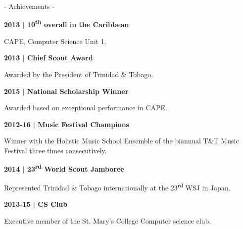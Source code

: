 \documentclass{article}
\newcommand{\ts}{\textsuperscript}
\begin{document}
\begin{minipage}[t]{0.35\textwidth}
{\LARGE\sc - Achievements -} \smallskip\par
{\footnotesize\sffamily\bf 2013 $|$ {\small10\ts{th} overall in the Caribbean}}\par
{\small{}\selectfont CAPE, Computer Science Unit 1.}\par
{\footnotesize\sffamily\bf 2013 $|$ {\small Chief Scout Award}}\par
{\small{}\selectfont Awarded by the President of Trinidad \& Tobago.}\par
{\footnotesize\sffamily\bf 2015 $|$ {\small National Scholarship Winner}}\par
{\small{}\selectfont Awarded based on exceptional performance in CAPE.}\par
{\footnotesize\sffamily\bf 2012-16 $|$ {\small Music Festival Champions}}\par
{\small{}\selectfont Winner with the Holistic Music School Ensemble of the biannual T\&T Music Festival three times consecutively.}\par
{\footnotesize\sffamily\bf 2014 $|$ {\small 23\ts{rd} World Scout Jamboree}}\par
{\small{}\selectfont Represented Trinidad \& Tobago internationally at the 23\ts{rd} WSJ in Japan.}
\bigskip

\vspace{10mm}
{\sffamily\bf 2013-15 $|$ {\large CS Club}}\par
{\small{}\selectfont Executive member of the St. Mary's College Computer science club.}


\end{minipage}
\end{document}
